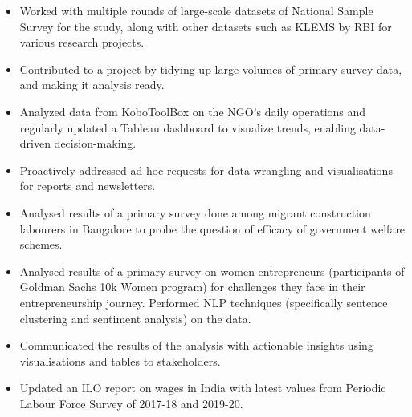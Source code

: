 \documentclass[9pt,a4paper]{altacv}
\begin{document}
\begin{paracol}{2}
\begin{itemize}
\end{itemize}
\begin{itemize}
    \item Worked with multiple rounds of large-scale datasets of National Sample Survey for the study, along with other datasets such as KLEMS by RBI for various research projects.
    \item Contributed to a project by tidying up large volumes of primary survey data, and making it analysis ready.
\end{itemize}
\begin{itemize}
    \item Analyzed data from KoboToolBox on the NGO's daily operations and regularly updated a Tableau dashboard to visualize trends, enabling data-driven decision-making.
    \item Proactively addressed ad-hoc requests for data-wrangling and visualisations for reports and newsletters.
\end{itemize}
\divider
{}
\begin{itemize}
    \item Analysed results of a primary survey done among migrant construction labourers in Bangalore to probe the question of efficacy of government welfare schemes.
\end{itemize}
\divider
{}
\begin{itemize}
    \item Analysed results of a primary survey on women entrepreneurs (participants of Goldman Sachs 10k Women program) for challenges they face in their entrepreneurship journey. Performed NLP techniques (specifically sentence clustering and sentiment analysis) on the data. 
    \item Communicated the results of the analysis with actionable insights using visualisations and tables to stakeholders.
\end{itemize}
\divider
{}
\begin{itemize}
    \item Updated an ILO report on wages in India with latest values from Periodic Labour Force Survey of 2017-18 and 2019-20. 
\end{itemize}




\end{paracol}
\end{document}
